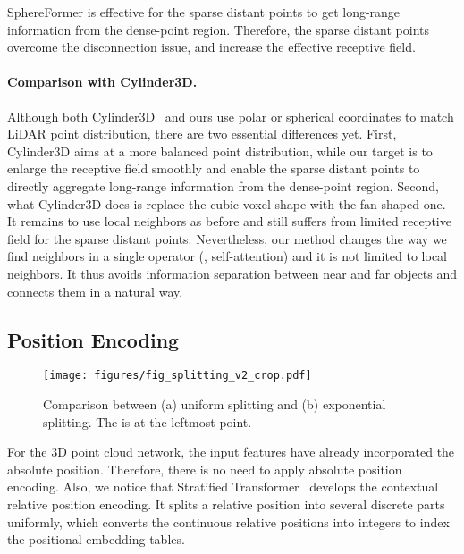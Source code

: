 \documentclass[10pt,twocolumn,letterpaper]{article}
\begin{document}
SphereFormer is effective for the sparse distant points to get long-range information from the dense-point region. Therefore, the sparse distant points overcome the disconnection issue, and increase the effective receptive field.

\paragraph{Comparison with Cylinder3D.}
Although both Cylinder3D~\cite{zhu2021cylindrical} and ours use polar or spherical coordinates to match LiDAR point distribution, there are two essential differences yet. First, Cylinder3D aims at a more balanced point distribution, while our target is to enlarge the receptive field smoothly and enable the sparse distant points to directly aggregate long-range information from the dense-point region. Second, what Cylinder3D does is replace the cubic voxel shape with the fan-shaped one. It remains to use local neighbors as before and still suffers from limited receptive field for the sparse distant points. Nevertheless, our method changes the way we find neighbors in a single operator (\ie, self-attention) and it is not limited to local neighbors. It thus avoids information separation between near and far objects and connects them in a natural way. 



\subsection{Position Encoding} 
\label{sec:pe}

\begin{figure}
\begin{center}
\texttt{[image: figures/fig\_splitting\_v2\_crop.pdf]}
\end{center}
\vspace{-0.6cm}
\caption{Comparison between (a) uniform splitting and (b) {exponential splitting}. The  is at the leftmost point.}
\label{fig:splitting}
\vspace{-0.1cm}
\end{figure}

For the 3D point cloud network, the input features have already incorporated the absolute  position. Therefore, there is no need to apply absolute position encoding. Also, we notice that Stratified Transformer~\cite{lai2022stratified} develops the contextual relative position encoding. It splits a relative position into several discrete parts uniformly, which converts the continuous relative positions into integers to index the positional embedding tables. 
\end{document}
